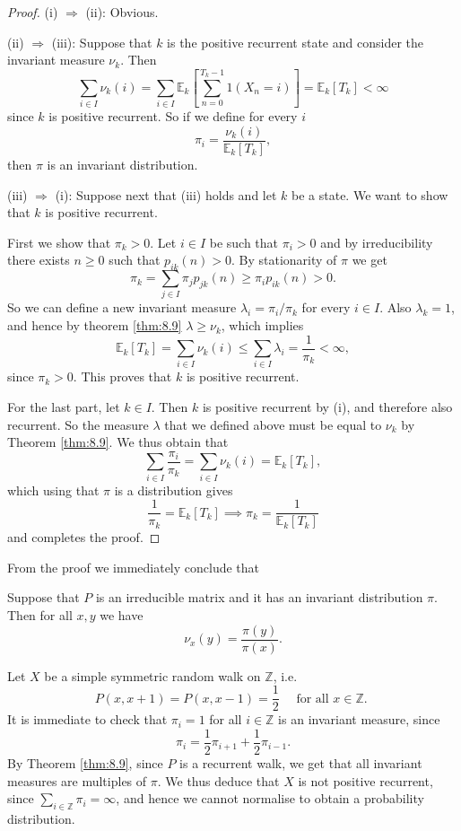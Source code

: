 \documentclass[a4paper,11pt]{article}
\begin{document}
\begin{proof}
    (i) $ \Rightarrow$ (ii): Obvious. 

    (ii) $ \Rightarrow $ (iii): Suppose that $k$ is the positive recurrent state and consider the invariant measure $\nu_k$. Then
    \[
    \sum_{i \in I} \nu_k(i)=\sum_{i \in I} \mathbb{E}_k\left[\sum_{n=0}^{T_k-1} 1\left(X_n=i\right)\right]=\mathbb{E}_k\left[T_k\right]<\infty
    \]
    since $k$ is positive recurrent. So if we define for every $i$
    \[
    \pi_i=\frac{\nu_k(i)}{\mathbb{E}_k\left[T_k\right]},
    \]
    then $\pi$ is an invariant distribution.

    (iii) $ \Rightarrow $ (i): Suppose next that (iii) holds and let $k$ be a state. We want to show that $k$ is positive recurrent. 
    
    First we show that $\pi_k>0$. Let $i \in I$ be such that $\pi_i>0$ and by irreducibility there exists $n \geq 0$ such that $p_{i k}(n)>0$. By stationarity of $\pi$ we get
    \[
    \pi_k=\sum_{j \in I} \pi_j p_{j k}(n) \geq \pi_i p_{i k}(n)>0 .
    \]
    So we can define a new invariant measure $\lambda_i=\pi_i / \pi_k$ for every $i \in I$. Also $\lambda_k=1$, and hence by theorem \ref{thm:8.9} $\lambda \geq \nu_k$, which implies
    \[
    \mathbb{E}_k\left[T_k\right]=\sum_{i \in I} \nu_k(i) \leq \sum_{i \in I} \lambda_i=\frac{1}{\pi_k}<\infty,
    \]
    since $\pi_k>0$. This proves that $k$ is positive recurrent.

    For the last part, let $k \in I$. Then $k$ is positive recurrent by (i), and therefore also recurrent. So the measure $\lambda$ that we defined above must be equal to $\nu_k$ by Theorem \ref{thm:8.9}. We thus obtain that
    \[
    \sum_{i \in I} \frac{\pi_i}{\pi_k}=\sum_{i \in I} \nu_k(i)=\mathbb{E}_k\left[T_k\right],
    \]
    which using that $\pi$ is a distribution gives
    \[
    \frac{1}{\pi_k}=\mathbb{E}_k\left[T_k\right] \implies \pi_k = \frac{1}{\mathbb{E}_k[T_k]}
    \]
    and completes the proof.
\end{proof}

From the proof we immediately conclude that

\begin{corollary}\label{col:8.12}
    Suppose that $P$ is an irreducible matrix and it has an invariant distribution $\pi$. Then for all $x, y$ we have
    \[
    \nu_x(y)=\frac{\pi(y)}{\pi(x)} .
    \]
\end{corollary}

\begin{example}
    Let $X$ be a simple symmetric random walk on $\mathbb{Z}$, i.e.
    \[
    P(x, x+1)=P(x, x-1)=\frac{1}{2} \quad \text { for all } x \in \mathbb{Z} \text {. }
    \]
    It is immediate to check that $\pi_i=1$ for all $i \in \mathbb{Z}$ is an invariant measure, since
    \[
    \pi_i=\frac{1}{2} \pi_{i+1}+\frac{1}{2} \pi_{i-1} .
    \]
    By Theorem \ref{thm:8.9}, since $P$ is a recurrent walk, we get that all invariant measures are multiples of $\pi$. We thus deduce that $X$ is not positive recurrent, since $\sum_{i \in \mathbb{Z}} \pi_i=\infty$, and hence we cannot normalise to obtain a probability distribution.
\end{example}
\end{document}
